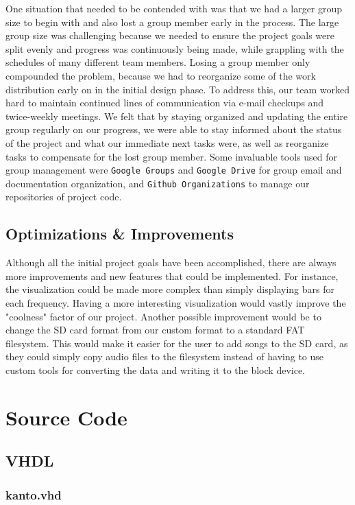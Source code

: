\documentclass{article}
\begin{document}
One situation that needed to be contended with was that we had a larger group size 
to begin with and also lost a group member early in the process. The large group size 
was challenging because we needed to ensure the project goals were split evenly 
and progress was continuously being made, while grappling with the schedules of 
many different team members. Losing a group member only compounded the 
problem, because we had to reorganize some of the work distribution early on in the 
initial design phase. To address this, our team worked hard to maintain continued 
lines of communication via e-mail checkups and twice-weekly meetings. We felt that 
by staying organized and updating the entire group regularly on our progress, we 
were able to stay informed about the status of the project and what our immediate 
next tasks were, as well as reorganize tasks to compensate for the lost group 
member. Some invaluable tools used for group management were \texttt{Google 
Groups} and \texttt{Google Drive} for group email and documentation organization, 
and \texttt{Github Organizations} to manage our repositories of project code.

\subsection{Optimizations \& Improvements}

Although all the initial project goals have been accomplished, there are always 
more improvements and new features that could be implemented.
For instance, the visualization could be made more complex than simply 
displaying bars for each frequency. Having a more interesting visualization 
would vastly improve the "coolness" factor of our project. Another possible 
improvement would be to change the SD card format from our custom format to a 
standard FAT filesystem. This would make it easier for the user to add songs to 
the SD card, as they could simply copy audio files to the filesystem instead of 
having to use custom tools for converting the data and writing it to the block 
device.
 
\appendix

\section{Source Code}
\subsection{VHDL}
	\subsubsection{kanto.vhd}
	
\end{document}

